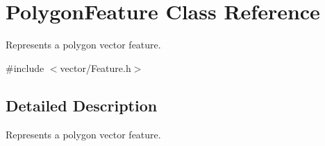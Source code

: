 \hypertarget{class_polygon_feature}{}\section{Polygon\+Feature Class Reference}
\label{class_polygon_feature}


Represents a polygon vector feature.  




{\ttfamily \#include $<$vector/\+Feature.\+h$>$}



\subsection{Detailed Description}
Represents a polygon vector feature. 